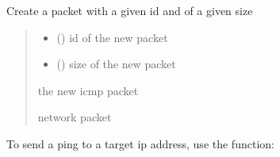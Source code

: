 \documentclass[letterpaper,10pt,english,openany,oneside]{sphinxmanual}
\begin{document}
\begin{fulllineitems}
\label{\detokenize{index:my_ping.create_packet}}
\pysigstartsignatures
\pysiglinewithargsret
{}
{\sphinxparamcomma {}}
{}
\pysigstopsignatures
\sphinxAtStartPar
Create a packet with a given id and of a given size
\begin{quote}\begin{description}
\begin{itemize}
\item {} 
\sphinxAtStartPar
{} () \textendash{} id of the new packet

\item {} 
\sphinxAtStartPar
{} () \textendash{} size of the new packet

\end{itemize}

\sphinxAtStartPar
the new icmp packet

\sphinxAtStartPar
network packet

\end{description}\end{quote}

\end{fulllineitems}


\sphinxAtStartPar
To send a ping to a target ip address, use the  function:
\end{document}
